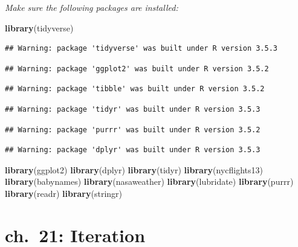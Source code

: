 \documentclass[]{book}
\newenvironment{Shaded}{\begin{snugshade}}{\end{snugshade}}
\newcommand{\KeywordTok}[1]{\textcolor[rgb]{0.13,0.29,0.53}{\textbf{#1}}}
\newcommand{\NormalTok}[1]{#1}
\theoremstyle{definition}
\theoremstyle{definition}
\theoremstyle{definition}
\theoremstyle{remark}
\begin{document}
\emph{Make sure the following packages are installed:}

\begin{Shaded}
\begin{Highlighting}[]
\KeywordTok{library}\NormalTok{(tidyverse)}
\end{Highlighting}
\end{Shaded}

\begin{verbatim}
## Warning: package 'tidyverse' was built under R version 3.5.3
\end{verbatim}

\begin{verbatim}
## Warning: package 'ggplot2' was built under R version 3.5.2
\end{verbatim}

\begin{verbatim}
## Warning: package 'tibble' was built under R version 3.5.2
\end{verbatim}

\begin{verbatim}
## Warning: package 'tidyr' was built under R version 3.5.3
\end{verbatim}

\begin{verbatim}
## Warning: package 'purrr' was built under R version 3.5.2
\end{verbatim}

\begin{verbatim}
## Warning: package 'dplyr' was built under R version 3.5.3
\end{verbatim}

\begin{Shaded}
\begin{Highlighting}[]
\KeywordTok{library}\NormalTok{(ggplot2)}
\KeywordTok{library}\NormalTok{(dplyr)}
\KeywordTok{library}\NormalTok{(tidyr)}
\KeywordTok{library}\NormalTok{(nycflights13)}
\KeywordTok{library}\NormalTok{(babynames)}
\KeywordTok{library}\NormalTok{(nasaweather)}
\KeywordTok{library}\NormalTok{(lubridate)}
\KeywordTok{library}\NormalTok{(purrr)}
\KeywordTok{library}\NormalTok{(readr)}
\KeywordTok{library}\NormalTok{(stringr)}
\end{Highlighting}
\end{Shaded}

\hypertarget{ch.-21-iteration}{%
\chapter{ch.~21: Iteration}\label{ch.-21-iteration}}
\end{document}
